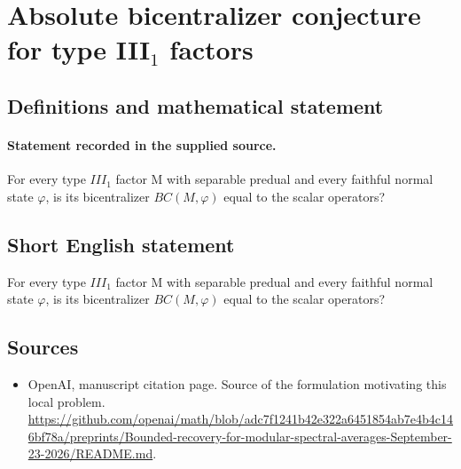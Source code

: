 \documentclass[11pt]{article}
\begin{document}
\section*{Absolute bicentralizer conjecture for type III$_1$ factors}\label{30007293}
\subsection{Definitions and mathematical statement}
\paragraph{Statement recorded in the supplied source.}
For every type $III_{1}$ factor M with separable predual and every faithful normal state $\varphi $, is its bicentralizer $BC(M,\varphi )$ equal to the scalar operators?
\subsection{Short English statement}
For every type $III_{1}$ factor M with separable predual and every faithful normal state $\varphi $, is its bicentralizer $BC(M,\varphi )$ equal to the scalar operators?
\subsection{Sources}
\begin{itemize}
\item[S1] OpenAI, manuscript citation page. Source of the formulation motivating this local problem.
\url{https://github.com/openai/math/blob/adc7f1241b42e322a6451854ab7e4b4c146bf78a/preprints/Bounded-recovery-for-modular-spectral-averages-September-23-2026/README.md}.
\end{itemize}
\end{document}
